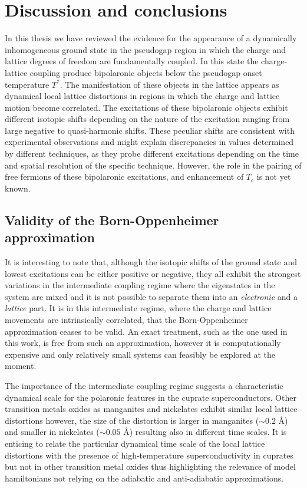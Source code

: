 \chapter{Discussion and conclusions}
\label{chap:conclusions}

In this thesis we have reviewed the evidence for the appearance of a dynamically inhomogeneous ground state in the pseudogap region in which the charge and lattice degrees of freedom are fundamentally coupled. 
In this state the charge-lattice coupling produce bipolaronic objects below the pseudogap onset temperature $T^*$. 
The manifestation of these objects in the lattice appears as dynamical local lattice distortions in regions in which the charge and lattice motion become correlated. 
The excitations of these bipolaronic objects exhibit different isotopic shifts depending on the nature of the excitation ranging from large negative to quasi-harmonic shifts. 
These peculiar shifts are consistent with experimental observations and might explain discrepancies in values determined by different techniques, as they probe different excitations depending on the time and spatial resolution of the specific technique. 
However, the role in the pairing of free fermions of these bipolaronic excitations, and enhancement of $T_c$ is not yet known. 

\section{Validity of the Born-Oppenheimer approximation}

It is interesting to note that, although the isotopic shifts of the ground state and lowest excitations can be either positive or negative, they all exhibit the strongest variations in the intermediate coupling regime where the eigenstates in the system are mixed and it is not possible to separate them into an \textit{electronic} and a \textit{lattice} part.
It is in this intermediate regime, where the charge and lattice movements are intrinsically correlated, that the Born-Oppenheimer approximation ceases to be valid.
An exact treatment, such as the one used in this work, is free from such an approximation, however it is computationally expensive and  only relatively small systems can feasibly be explored at the moment.

The importance of the intermediate coupling regime suggests a characteristic dynamical scale for the polaronic features in the cuprate superconductors. 
Other transition metals oxides as manganites and nickelates exhibit similar local lattice distortions however, the size of the distortion is larger in manganites ($\sim 0.2$ \AA) \cite{Tyson1996} and smaller in nickelates ($\sim 0.05$ \AA) \cite{Acosta-Alejandro2008} resulting also in different time scales. 
It is enticing to relate the particular dynamical time scale of the local lattice distortions with the presence of high-temperature superconductivity in cuprates but not in other transition metal oxides thus highlighting the relevance of model hamiltonians not relying on the adiabatic and anti-adiabatic approximations.

